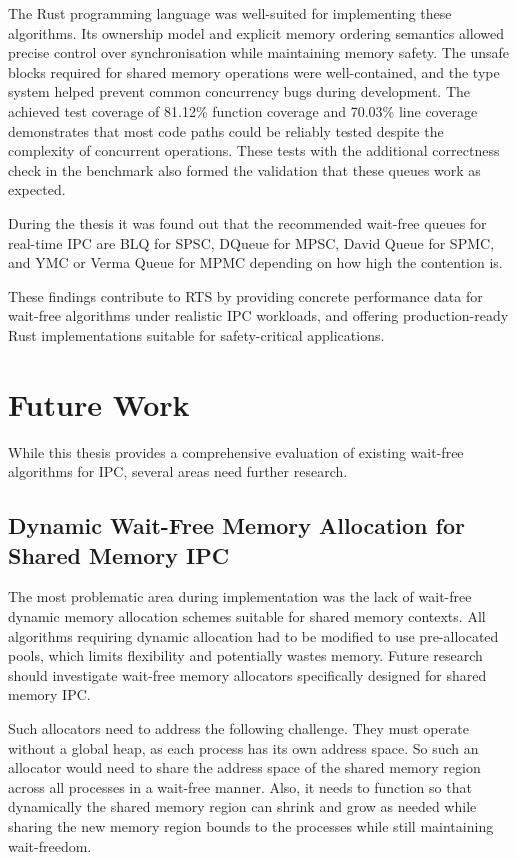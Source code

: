 The Rust programming language was well-suited for implementing these algorithms. Its ownership model and explicit memory ordering semantics allowed precise control over synchronisation while maintaining memory safety. The unsafe blocks required for shared memory operations were well-contained, and the type system helped prevent common concurrency bugs during development. The achieved test coverage of 81.12\% function coverage and 70.03\% line coverage demonstrates that most code paths could be reliably tested despite the complexity of concurrent operations. These tests with the additional correctness check in the benchmark also formed the validation that these queues work as expected.

During the thesis it was found out that the recommended wait-free queues for real-time \ac{IPC} are \acf{BLQ} for \ac{SPSC}, DQueue for \ac{MPSC}, David Queue for \ac{SPMC}, and \ac{YMC} or Verma Queue for \ac{MPMC} depending on how high the contention is.

These findings contribute to \ac{RTS} by providing concrete performance data for wait-free algorithms under realistic \ac{IPC} workloads, and offering production-ready Rust implementations suitable for safety-critical applications.

\section{Future Work}
While this thesis provides a comprehensive evaluation of existing wait-free algorithms for \ac{IPC}, several areas need further research.

\subsection{Dynamic Wait-Free Memory Allocation for Shared Memory \acf{IPC}}
The most problematic area during implementation was the lack of wait-free dynamic memory allocation schemes suitable for shared memory contexts. All algorithms requiring dynamic allocation had to be modified to use pre-allocated pools, which limits flexibility and potentially wastes memory. Future research should investigate wait-free memory allocators specifically designed for shared memory \ac{IPC}.

Such allocators need to address the following challenge. They must operate without a global heap, as each process has its own address space. So such an allocator would need to share the address space of the shared memory region across all processes in a wait-free manner. Also, it needs to function so that dynamically the shared memory region can shrink and grow as needed while sharing the new memory region bounds to the processes while still maintaining wait-freedom.

